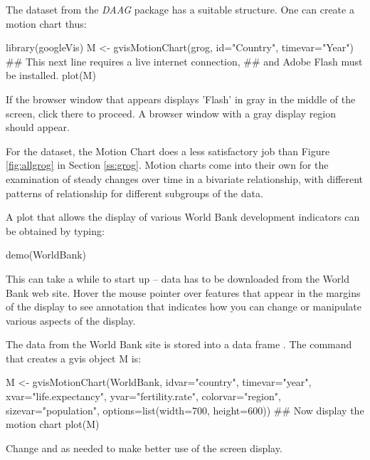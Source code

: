 The dataset  from the {\em DAAG} package has a suitable
structure.  One can create a motion chart thus:
\begin{minipage}[t]{1.075\textwidth}
\begin{Schunk}
\begin{Sinput}
library(googleVis)
M <- gvisMotionChart(grog, id="Country", timevar="Year")
## This next line requires a live internet connection,
## and Adobe Flash must be installed.
plot(M)
\end{Sinput}
\end{Schunk}
\end{minipage}
If the browser window that appears displays 'Flash' in gray in the
middle of the screen, click there to proceed.  A browser window with a
gray display region should appear.

For the  dataset, the Motion Chart does a less satisfactory
job than Figure \ref{fig:allgrog} in Section \ref{ss:grog}.  Motion
charts come into their own for the examination of steady changes over
time in a bivariate relationship, with different patterns of
relationship for different subgroups of the data.

A plot that allows the display of various World Bank development
indicators can be obtained by typing:
\begin{Schunk}
\begin{Sinput}
demo(WorldBank)
\end{Sinput}
\end{Schunk}
This can take a while to start up -- data has to be downloaded from
the World Bank web site. Hover the mouse pointer over features that
appear in the margins of the display to see annotation that indicates
how you can change or manipulate various aspects of the display.

The data from the World Bank site is stored into a data frame
.  The command that creates a gvis object M
is:
\begin{Schunk}
\begin{Sinput}
M <- gvisMotionChart(WorldBank, idvar="country",
          timevar="year",
          xvar="life.expectancy",
          yvar="fertility.rate",
          colorvar="region", sizevar="population",
          options=list(width=700, height=600))
## Now display the motion chart
plot(M)
\end{Sinput}
\end{Schunk}
Change  and  as needed to make better
use of the screen display.

